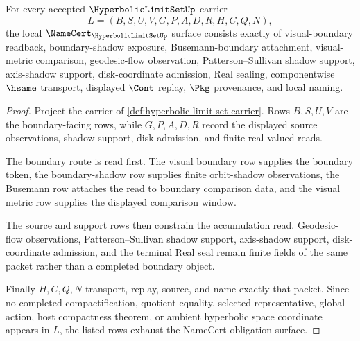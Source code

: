 \begin{theorem}
\label{thm:hyperbolic-limit-set-namecert-obligations}
For every accepted $\HyperbolicLimitSetUp$ carrier
$$
L=(B,S,U,V,G,P,A,D,R,H,C,Q,N),
$$
the local $\NameCert_{\HyperbolicLimitSetUp}$ surface consists exactly of visual-boundary readback, boundary-shadow exposure, Busemann-boundary attachment, visual-metric comparison, geodesic-flow observation, Patterson--Sullivan shadow support, axis-shadow support, disk-coordinate admission, Real sealing, componentwise $\hsame$ transport, displayed $\Cont$ replay, $\Pkg$ provenance, and local naming.
\end{theorem}
\begin{proof}
Project the carrier of \autoref{def:hyperbolic-limit-set-carrier}. Rows $B,S,U,V$ are the boundary-facing rows, while $G,P,A,D,R$ record the displayed source observations, shadow support, disk admission, and finite real-valued reads.

The boundary route is read first. The visual boundary row supplies the boundary token, the boundary-shadow row supplies finite orbit-shadow observations, the Busemann row attaches the read to boundary comparison data, and the visual metric row supplies the displayed comparison window.

The source and support rows then constrain the accumulation read. Geodesic-flow observations, Patterson--Sullivan shadow support, axis-shadow support, disk-coordinate admission, and the terminal Real seal remain finite fields of the same packet rather than a completed boundary object.

Finally $H,C,Q,N$ transport, replay, source, and name exactly that packet. Since no completed compactification, quotient equality, selected representative, global action, host compactness theorem, or ambient hyperbolic space coordinate appears in $L$, the listed rows exhaust the NameCert obligation surface.
\end{proof}

